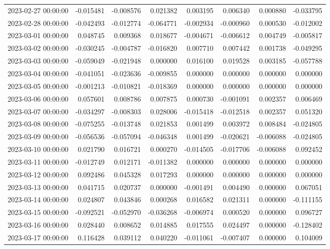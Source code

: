 \begin{tabular}{lrrrrrrr}
2023-02-27 00:00:00 & -0.015481 & -0.008576 & 0.021382 & 0.003195 & 0.006340 & 0.000880 & -0.033795 \\
2023-02-28 00:00:00 & -0.042493 & -0.012774 & -0.064771 & -0.002934 & -0.000960 & 0.000530 & -0.012002 \\
2023-03-01 00:00:00 & 0.048745 & 0.009368 & 0.018677 & -0.004671 & -0.006612 & 0.004749 & -0.005817 \\
2023-03-02 00:00:00 & -0.030245 & -0.004787 & -0.016820 & 0.007710 & 0.007442 & 0.001738 & -0.049295 \\
2023-03-03 00:00:00 & -0.059049 & -0.021948 & 0.000000 & 0.016100 & 0.019528 & 0.003185 & -0.057788 \\
2023-03-04 00:00:00 & -0.041051 & -0.023636 & -0.009855 & 0.000000 & 0.000000 & 0.000000 & 0.000000 \\
2023-03-05 00:00:00 & -0.001213 & -0.010821 & -0.018369 & 0.000000 & 0.000000 & 0.000000 & 0.000000 \\
2023-03-06 00:00:00 & 0.057601 & 0.008786 & 0.007875 & 0.000730 & -0.001091 & 0.002357 & 0.006469 \\
2023-03-07 00:00:00 & -0.034297 & -0.008303 & 0.028006 & -0.015418 & -0.012518 & 0.002357 & 0.051320 \\
2023-03-08 00:00:00 & -0.075255 & -0.013748 & 0.021853 & 0.001499 & 0.003972 & 0.008484 & -0.024805 \\
2023-03-09 00:00:00 & -0.056536 & -0.057094 & -0.046348 & 0.001499 & -0.020621 & -0.006088 & -0.024805 \\
2023-03-10 00:00:00 & 0.021790 & 0.016721 & 0.000270 & -0.014505 & -0.017706 & -0.006088 & 0.092452 \\
2023-03-11 00:00:00 & -0.012749 & 0.012171 & -0.011382 & 0.000000 & 0.000000 & 0.000000 & 0.000000 \\
2023-03-12 00:00:00 & 0.092486 & 0.045328 & 0.017293 & 0.000000 & 0.000000 & 0.000000 & 0.000000 \\
2023-03-13 00:00:00 & 0.041715 & 0.020737 & 0.000000 & -0.001491 & 0.004490 & 0.000000 & 0.067051 \\
2023-03-14 00:00:00 & 0.024807 & 0.043846 & 0.000268 & 0.016582 & 0.021311 & 0.000000 & -0.111155 \\
2023-03-15 00:00:00 & -0.092521 & -0.052970 & -0.036268 & -0.006974 & 0.000520 & 0.000000 & 0.096727 \\
2023-03-16 00:00:00 & 0.028440 & 0.008652 & 0.014885 & 0.017555 & 0.024497 & 0.000000 & -0.128402 \\
2023-03-17 00:00:00 & 0.116428 & 0.039112 & 0.040220 & -0.011061 & -0.007407 & 0.000000 & 0.104009 \\

\end{tabular}

